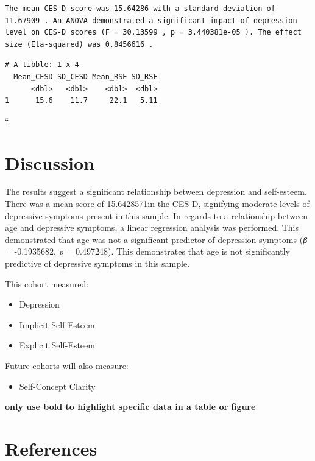 \documentclass[
]{article}
\providecommand{\tightlist}{%
  \setlength{\itemsep}{0pt}\setlength{\parskip}{0pt}}\usepackage{longtable,booktabs,array}
\newlength{\cslhangindent}
\newenvironment{CSLReferences}[2] %
 {\begin{list}{}{%
  \setlength{\itemindent}{0pt}
  \setlength{\leftmargin}{0pt}
  \setlength{\parsep}{0pt}
  \ifodd #1
   \setlength{\leftmargin}{\cslhangindent}
   \setlength{\itemindent}{-1\cslhangindent}
  \fi
  \setlength{\itemsep}{#2\baselineskip}}}
 {\end{list}}
\begin{document}
\begin{verbatim}
The mean CES-D score was 15.64286 with a standard deviation of 11.67909 . An ANOVA demonstrated a significant impact of depression level on CES-D scores (F = 30.13599 , p = 3.440381e-05 ). The effect size (Eta-squared) was 0.8456616 .
\end{verbatim}

\begin{verbatim}
# A tibble: 1 x 4
  Mean_CESD SD_CESD Mean_RSE SD_RSE
      <dbl>   <dbl>    <dbl>  <dbl>
1      15.6    11.7     22.1   5.11
\end{verbatim}

``.

\section{Discussion}\label{discussion}

The results suggest a significant relationship between depression and
self-esteem. There was a mean score of 15.6428571in the CES-D,
signifying moderate levels of depressive symptoms present in this
sample. In regards to a relationship between age and depressive
symptoms, a linear regression analysis was performed. This demonstrated
that age was not a significant predictor of depression symptoms
(\emph{β} = -0.1935682, \emph{p} = 0.497248). This demonstrates that age
is not significantly predictive of depressive symptoms in this sample.

This cohort measured:

\begin{itemize}
\item
  Depression
\item
  Implicit Self-Esteem
\item
  Explicit Self-Esteem
\end{itemize}

Future cohorts will also measure:

\begin{itemize}
\tightlist
\item
  Self-Concept Clarity
\end{itemize}

\textbf{only use bold to highlight specific data in a table or figure}

\section{References}\label{references}

\label{refs}
\begin{CSLReferences}{0}{1}
\end{CSLReferences}
\end{document}
